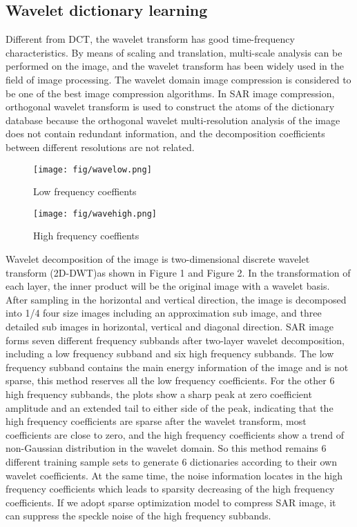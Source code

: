\documentclass[10pt,a4paper,journal]{IEEEtran}
\begin{document}
\subsection{Wavelet dictionary learning}
\hspace*{2em}  Different from DCT\cite{2}, the wavelet transform has good time-frequency characteristics. By means of scaling and translation, multi-scale analysis can be performed on the image, and the wavelet transform has been widely used in the field of image processing. The wavelet domain image compression is considered to be one of the best image compression algorithms. In SAR image compression, orthogonal wavelet transform is used to construct the atoms of the dictionary database because the orthogonal wavelet multi-resolution analysis of the image does not contain redundant information, and the decomposition coefficients between different resolutions are not related.\\
\begin{figure}[htbp]
\centering
\texttt{[image: fig/wavelow.png]}
\caption{Low frequency coeffients \cite{1}}
\end{figure}
\begin{figure}[htbp]
\centering
\texttt{[image: fig/wavehigh.png]}
\caption{High frequency coeffients\cite{1}}
\end{figure}
Wavelet decomposition of the image is two-dimensional discrete wavelet transform (2D-DWT)as shown in Figure 1 and Figure 2. In the transformation of each layer, the inner product will be the original image with a wavelet basis. After sampling in the horizontal and vertical direction, the image is decomposed into 1/4 four size images including an approximation sub image, and three detailed sub images in horizontal, vertical and diagonal direction.  SAR image forms seven different frequency subbands after two-layer wavelet decomposition, including a low frequency subband and six high frequency subbands. The low frequency subband  contains the main energy information of the image and is not sparse, this method reserves all the low frequency coefficients. For the other 6 high frequency subbands, the plots show a sharp peak at zero coefficient amplitude and an extended tail to either side of the peak, indicating that the high frequency coefficients are sparse after the wavelet transform, most coefficients are close to zero, and the high frequency coefficients show a trend of non-Gaussian distribution in the wavelet domain. So this method remains 6 different training sample sets to generate 6 dictionaries according to their own wavelet coefficients. At the same time, the noise information locates in the high frequency coefficients which leads to sparsity decreasing of the high frequency coefficients. If we adopt sparse optimization model to compress SAR image, it can suppress the speckle noise of the high frequency subbands.
\end{document}
